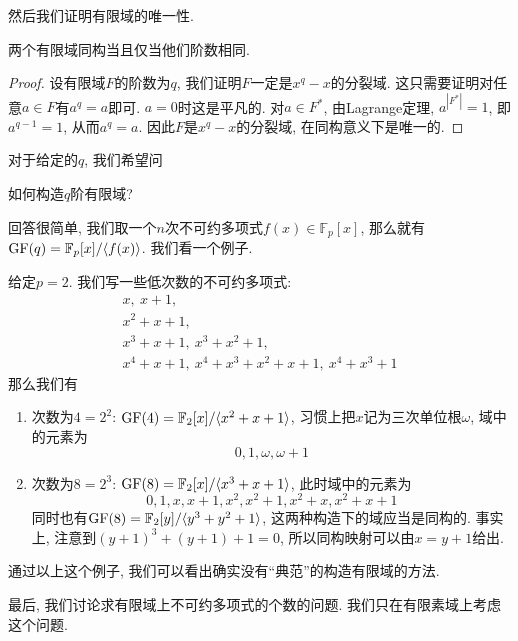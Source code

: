 然后我们证明有限域的唯一性.
\begin{thm}
    两个有限域同构当且仅当他们阶数相同.
\end{thm}
\begin{proof}
    设有限域$F$的阶数为$q$, 我们证明$F$一定是$x^q-x$的分裂域.
    这只需要证明对任意$a\in F$有$a^q=a$即可.
    $a=0$时这是平凡的.
    对$a\in F^*$, 由Lagrange定理, $a^{|F^*|}=1$, 即$a^{q-1}=1$, 从而$a^q=a$.
    因此$F$是$x^q-x$的分裂域, 在同构意义下是唯一的.
\end{proof}

对于给定的$q$, 我们希望问
\begin{pro}
    如何构造$q$阶有限域?
\end{pro}
回答很简单, 我们取一个$n$次不可约多项式$f(x)\in\mathbb{F}_p[x]$, 那么就有$\operatorname{GF}(q)=\mathbb{F}_p[x]/\langle f(x)\rangle$.
我们看一个例子.

\begin{eg}
    给定$p=2$.
    我们写一些低次数的不可约多项式:
    \begin{gather*}
        x,\ x+1,\\
        x^2+x+1,\\
        x^3+x+1,\ x^3+x^2+1,\\
        x^4+x+1,\ x^4+x^3+x^2+x+1,\ x^4+x^3+1
    \end{gather*}
    那么我们有
    \begin{enumerate}[(1)]
        \item 次数为$4=2^2$: $\operatorname{GF}(4)=\mathbb{F}_2[x]/\langle x^2+x+1\rangle$, 习惯上把$x$记为三次单位根$\omega$, 域中的元素为
        \[0,1,\omega,\omega+1\]
        \item 次数为$8=2^3$: $\operatorname{GF}(8)=\mathbb{F}_2[x]/\langle x^3+x+1\rangle$, 此时域中的元素为
        \[0,1,x,x+1,x^2,x^2+1,x^2+x,x^2+x+1\]
        同时也有$\operatorname{GF}(8)=\mathbb{F}_2[y]/\langle y^3+y^2+1\rangle$, 这两种构造下的域应当是同构的.
        事实上, 注意到$(y+1)^3+(y+1)+1=0$, 所以同构映射可以由$x=y+1$给出.
    \end{enumerate}
\end{eg}

通过以上这个例子, 我们可以看出确实没有``典范''的构造有限域的方法.

最后, 我们讨论求有限域上不可约多项式的个数的问题.
我们只在有限素域上考虑这个问题.


